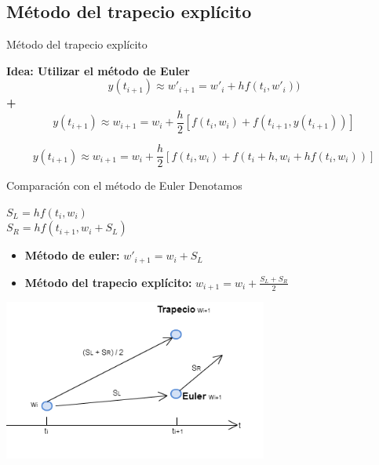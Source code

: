 	\subsection{Método del trapecio explícito}


		\begin{frame}{Método del trapecio explícito}
			\fontsize{10}{10}\selectfont		
			\centering
			\begin{tcolorbox}[colback=ChetwodeBlue!10,colframe=ChetwodeBlue!60]
				\centering
				\textbf{Idea: Utilizar el método de Euler}
				\begin{equation*}
					y(t_{i+1}) \approx w'_{i+1} = w'_i + h f(t_i,w'_i))
				\end{equation*}
				{\large\textbf{+}}
				\begin{equation*}
					y(t_{i+1}) \approx w_{i+1} = w_i + \frac{h}{2} \left[f(t_i,w_i) + f(t_{i+1}, y(t_{i+1}))\right]
				\end{equation*}			
			\end{tcolorbox}			

			 \begin{definition}
				\begin{equation} \label{eq:app-exp}
					y(t_{i+1}) \approx w_{i+1} = w_i + \frac{h}{2} \left[f(t_i,w_i) + f(t_{i}+h, w_i + h f(t_i,w_i))\right]
				\end{equation}
			 \end{definition}
			
		\end{frame}

		\begin{frame}{Comparación con el método de Euler}
			\fontsize{10}{10}\selectfont		
			\centering
			\kern3mm
			Denotamos
			\begin{cases}
				$S_L = h f(t_i,w_i)$ \\
				$S_R = h f(t_{i+1}, w_i + S_L)$ \\
			\end{cases}

			\kern3mm
			\begin{itemize}
				\item \textbf{Método de euler:} $w'_{i+1} = w_i + S_L$
				\item \textbf{Método del trapecio explícito:} $w_{i+1} = w_i + \frac{S_L + S_R}{2}$
			\end{itemize}

			\kern3mm
			\includegraphics[width=0.65\textwidth]{./Images/trapecio-vs-euler.png}
		\end{frame}
		

